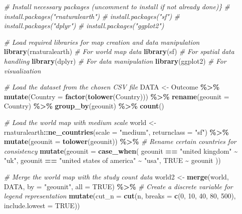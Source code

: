 \documentclass[
]{book}
\newenvironment{Shaded}{\begin{snugshade}}{\end{snugshade}}
\newcommand{\AttributeTok}[1]{\textcolor[rgb]{0.13,0.29,0.53}{#1}}
\newcommand{\CommentTok}[1]{\textcolor[rgb]{0.56,0.35,0.01}{\textit{#1}}}
\newcommand{\ConstantTok}[1]{\textcolor[rgb]{0.56,0.35,0.01}{#1}}
\newcommand{\DecValTok}[1]{\textcolor[rgb]{0.00,0.00,0.81}{#1}}
\newcommand{\FunctionTok}[1]{\textcolor[rgb]{0.13,0.29,0.53}{\textbf{#1}}}
\newcommand{\NormalTok}[1]{#1}
\newcommand{\OtherTok}[1]{\textcolor[rgb]{0.56,0.35,0.01}{#1}}
\newcommand{\SpecialCharTok}[1]{\textcolor[rgb]{0.81,0.36,0.00}{\textbf{#1}}}
\newcommand{\StringTok}[1]{\textcolor[rgb]{0.31,0.60,0.02}{#1}}
\begin{document}
\begin{Shaded}
\begin{Highlighting}[]
\CommentTok{\# Install necessary packages (uncomment to install if not already done)\}}
\CommentTok{\# install.packages("rnaturalearth")}
\CommentTok{\# install.packages("sf")}
\CommentTok{\# install.packages("dplyr")}
\CommentTok{\# install.packages("ggplot2")}

\CommentTok{\# Load required libraries for map creation and data manipulation}
\FunctionTok{library}\NormalTok{(rnaturalearth)  }\CommentTok{\# For world map data}
\FunctionTok{library}\NormalTok{(sf)             }\CommentTok{\# For spatial data handling}
\FunctionTok{library}\NormalTok{(dplyr)          }\CommentTok{\# For data manipulation}
\FunctionTok{library}\NormalTok{(ggplot2)        }\CommentTok{\# For visualization}

\CommentTok{\# Load the dataset from the chosen CSV file}
\NormalTok{DATA }\OtherTok{\textless{}{-}}\NormalTok{ Outcome }\SpecialCharTok{\%\textgreater{}\%}
  \FunctionTok{mutate}\NormalTok{(}\AttributeTok{Country =} \FunctionTok{factor}\NormalTok{(}\FunctionTok{tolower}\NormalTok{(Country))) }\SpecialCharTok{\%\textgreater{}\%}
  \FunctionTok{rename}\NormalTok{(}\AttributeTok{geounit =}\NormalTok{ Country) }\SpecialCharTok{\%\textgreater{}\%}
  \FunctionTok{group\_by}\NormalTok{(geounit) }\SpecialCharTok{\%\textgreater{}\%}
  \FunctionTok{count}\NormalTok{()}

\CommentTok{\# Load the world map with medium scale}
\NormalTok{world }\OtherTok{\textless{}{-}}\NormalTok{ rnaturalearth}\SpecialCharTok{::}\FunctionTok{ne\_countries}\NormalTok{(}\AttributeTok{scale =} \StringTok{"medium"}\NormalTok{, }\AttributeTok{returnclass =} \StringTok{"sf"}\NormalTok{) }\SpecialCharTok{\%\textgreater{}\%}
  \FunctionTok{mutate}\NormalTok{(}\AttributeTok{geounit =} \FunctionTok{tolower}\NormalTok{(geounit)) }\SpecialCharTok{\%\textgreater{}\%}
  \CommentTok{\# Rename certain countries for consistency}
  \FunctionTok{mutate}\NormalTok{(}\AttributeTok{geounit =} \FunctionTok{case\_when}\NormalTok{(}
\NormalTok{    geounit }\SpecialCharTok{==} \StringTok{"united kingdom"} \SpecialCharTok{\textasciitilde{}} \StringTok{"uk"}\NormalTok{,}
\NormalTok{    geounit }\SpecialCharTok{==} \StringTok{"united states of america"} \SpecialCharTok{\textasciitilde{}} \StringTok{"usa"}\NormalTok{,}
    \ConstantTok{TRUE} \SpecialCharTok{\textasciitilde{}}\NormalTok{ geounit}
\NormalTok{  ))}

\CommentTok{\# Merge the world map with the study count data}
\NormalTok{world2 }\OtherTok{\textless{}{-}} \FunctionTok{merge}\NormalTok{(world, DATA, }\AttributeTok{by =} \StringTok{"geounit"}\NormalTok{, }\AttributeTok{all =} \ConstantTok{TRUE}\NormalTok{) }\SpecialCharTok{\%\textgreater{}\%}
  \CommentTok{\# Create a discrete variable for legend representation}
  \FunctionTok{mutate}\NormalTok{(}\AttributeTok{cut\_n =} \FunctionTok{cut}\NormalTok{(n, }\AttributeTok{breaks =} \FunctionTok{c}\NormalTok{(}\DecValTok{0}\NormalTok{, }\DecValTok{10}\NormalTok{, }\DecValTok{40}\NormalTok{, }\DecValTok{80}\NormalTok{, }\DecValTok{500}\NormalTok{), }\AttributeTok{include.lowest =} \ConstantTok{TRUE}\NormalTok{))}


\end{Highlighting}
\end{Shaded}
\end{document}
